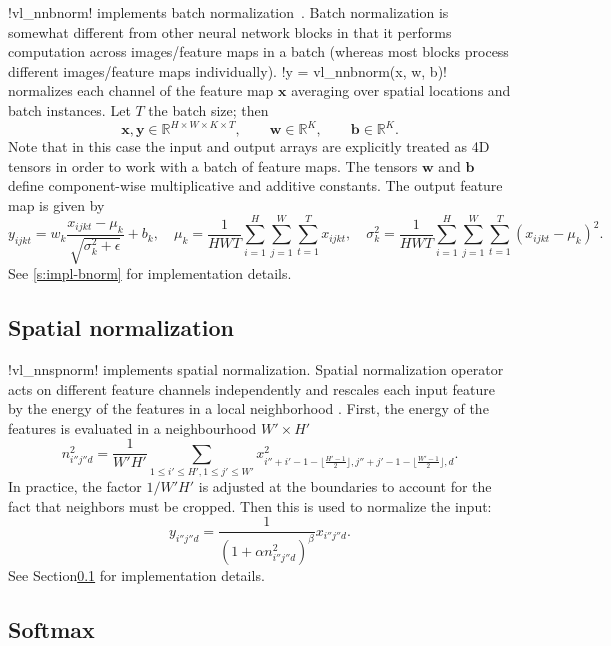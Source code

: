 !vl_nnbnorm! implements batch normalization~\cite{ioffe2015}. Batch normalization is somewhat different from other neural network blocks in that it performs computation across images/feature maps in a batch (whereas most blocks process different images/feature maps individually). !y = vl_nnbnorm(x, w, b)! normalizes each channel of the feature map $\mathbf{x}$ averaging over spatial locations and batch instances. Let $T$ the batch size; then
\[
\mathbf{x}, \mathbf{y} \in \mathbb{R}^{H \times W \times K \times T},
\qquad\mathbf{w} \in \mathbb{R}^{K},
\qquad\mathbf{b} \in \mathbb{R}^{K}.
\]
Note that in this case the input and output arrays are explicitly treated as 4D tensors in order to work with a batch of feature maps. The tensors  $\mathbf{w}$ and $\mathbf{b}$ define component-wise multiplicative and additive constants. The output feature map is given by
\[
y_{ijkt} = w_k \frac{x_{ijkt} - \mu_{k}}{\sqrt{\sigma_k^2 + \epsilon}} + b_k,
\quad
\mu_{k} = \frac{1}{HWT}\sum_{i=1}^H \sum_{j=1}^W \sum_{t=1}^{T} x_{ijkt},
\quad
\sigma^2_{k} = \frac{1}{HWT}\sum_{i=1}^H \sum_{j=1}^W \sum_{t=1}^{T} (x_{ijkt} - \mu_{k})^2.
\]
See \autoref{s:impl-bnorm} for implementation details.

\subsection{Spatial normalization}\label{s:spnorm}

!vl_nnspnorm! implements spatial normalization. Spatial normalization operator acts on different feature channels independently and rescales each input feature by the energy of the features in a local neighborhood . First, the energy of the features is evaluated in a neighbourhood $W'\times H'$
\[
n_{i''j''d}^2 = \frac{1}{W'H'}
\sum_{1\leq i' \leq H', 1 \leq j' \leq W'} x^2_{
i''+i'-1-\lfloor \frac{H'-1}{2}\rfloor,
j''+j'-1-\lfloor \frac{W'-1}{2}\rfloor,
d}.
\]
In practice, the factor $1/W'H'$ is adjusted at the boundaries to account for the fact that neighbors must be cropped. Then this is used to normalize the input:
\[
y_{i''j''d} = \frac{1}{(1 + \alpha n_{i''j''d}^2)^\beta} x_{i''j''d}.
\]
See Section\ref{s:spnorm} for implementation details.

\subsection{Softmax}\label{s:softmax}

